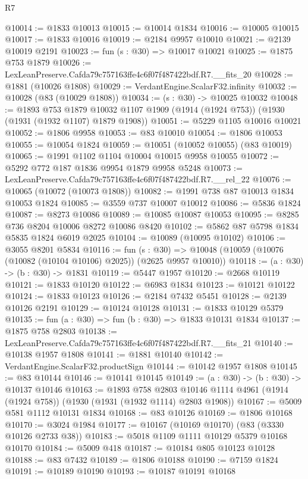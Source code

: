 \begin{lexlean}{R7}
\begin{coremodule}
@10014 := @1833 @10013
@10015 := @10014 @1834
@10016 := @10005 @10015
@10017 := @1833 @10016
@10019 := @2184 @9957 @10010
@10021 := @2139 @10019 @2191
@10023 := fun (s : @30) => @10017 @10021
@10025 := @1875 @753 @1879
@10026 := LexLeanPreserve.Cafda79c757163ffe4c6f07f487422bdf.R7.__fits_20
@10028 := @1881 (@10026 @1808)
@10029 := VerdantEngine.ScalarF32.infinity
@10032 := @10028 (@83 (@10029 @1808))
@10034 := (s : @30) -> @10025 @10032
@10048 := @1893
    @753
    @1879
    @10032
    @1107
    @1909
    (@1914 (@1924 @753))
    (@1930 (@1931 (@1932 @1107) @1879 @1908))
@10051 := @5229 @1105 @10016 @10021
@10052 := @1806 @9958
@10053 := @83 @10010
@10054 := @1806 @10053
@10055 := @10054 @1824
@10059 := @10051 (@10052 @10055) (@83 @10019)
@10065 := @1991 @1102 @1104 @10004 @10015 @9958 @10055
@10072 := @5292 @772 @187 @1836 @9954 @1879 @9958 @5248
@10073 := LexLeanPreserve.Cafda79c757163ffe4c6f07f487422bdf.R7.__rel_22
@10076 := @10065 (@10072 (@10073 @1808))
@10082 := @1991 @738 @87 @10013 @1834 @10053 @1824
@10085 := @3559 @737 @10007 @10012
@10086 := @5836 @1824
@10087 := @8273 @10086
@10089 := @10085 @10087 @10053
@10095 := @8285 @736 @8204 @10006 @8272 @10086 @8420
@10102 := @5862 @87 @5798 @1834 @5835 @1824 @6019 @2025
@10104 := @10089 (@10095 @10102)
@10106 := @3055 @8201 @5834
@10116 := fun (s : @30) =>
  @10048 (@10059 (@10076 (@10082 (@10104 @10106) @2025)) (@2625 @9957 @10010))
@10118 := (a : @30) -> (b : @30) -> @1831
@10119 := @5447 @1957
@10120 := @2668 @10119
@10121 := @1833 @10120
@10122 := @6983 @1834
@10123 := @10121 @10122
@10124 := @1833 @10123
@10126 := @2184 @7432 @5451
@10128 := @2139 @10126 @2191
@10129 := @10124 @10128
@10131 := @1833 @10129 @5379
@10135 := fun (a : @30) => fun (b : @30) => @1833 @10131 @1834
@10137 := @1875 @758 @2803
@10138 := LexLeanPreserve.Cafda79c757163ffe4c6f07f487422bdf.R7.__fits_21
@10140 := @10138 @1957 @1808
@10141 := @1881 @10140
@10142 := VerdantEngine.ScalarF32.productSign
@10144 := @10142 @1957 @1808
@10145 := @83 @10144
@10146 := @10141 @10145
@10149 := (a : @30) -> (b : @30) -> @10137 @10146
@10163 := @1893
    @758
    @2803
    @10146
    @1114
    @4961
    (@1914 (@1924 @758))
    (@1930 (@1931 (@1932 @1114) @2803 @1908))
@10167 := @5009 @581 @1112 @10131 @1834
@10168 := @83 @10126
@10169 := @1806 @10168
@10170 := @3024 @1984
@10177 := @10167 (@10169 @10170) (@83 (@3330 @10126 @2733 @38))
@10183 := @5018 @1109 @1111 @10129 @5379 @10168 @10170
@10184 := @5009 @418
@10187 := @10184 @805 @10123 @10128
@10188 := @83 @7432
@10189 := @1806 @10188
@10190 := @7159 @1824
@10191 := @10189 @10190
@10193 := @10187 @10191 @10168

\end{coremodule}
\end{lexlean}
